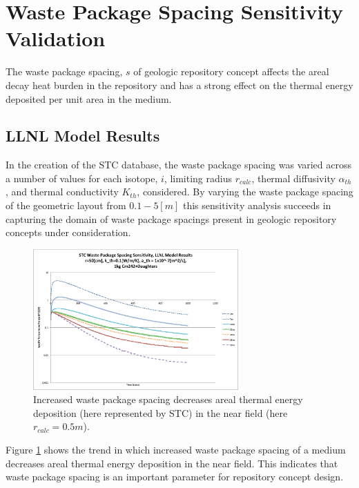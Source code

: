 \section{Waste Package Spacing Sensitivity Validation}\label{sec:spacing}
The waste package spacing, $s$ of geologic repository concept affects the areal 
decay heat burden in the repository and has a strong effect on the thermal 
energy deposited per unit area in the medium. 

\FloatBarrier
\subsection{LLNL Model Results}

In the creation of the \gls{STC} database, the waste package spacing was varied 
across a number of values for each isotope, $i$, limiting 
radius $r_{calc}$, thermal diffusivity $\alpha_{th}$, and thermal conductivity $K_{th}$, considered.  By 
varying the waste package spacing of the geometric layout from $0.1-5 [m]$
this sensitivity analysis succeeds in capturing the domain of 
waste package spacings present in geologic repository concepts under 
consideration. 

\begin{figure}[htbp!]
\begin{center}
\includegraphics[width=0.7\textwidth]{./chapters/demonstration/spacing/Cm242spacing_sens.eps}
\end{center}
\caption[$K_{th}$ Sensitivity to $s$]{Increased waste package 
spacing decreases areal thermal energy deposition 
(here represented by \gls{STC}) in the near field (here $r_{calc} = 0.5m$).}
\label{fig:Cm242spacing_sens}
\end{figure}

Figure \ref{fig:Cm242spacing_sens} shows the trend in which increased waste package spacing of a medium decreases areal thermal energy 
deposition in the near field. This indicates that waste package spacing is 
an important parameter for repository concept design.


